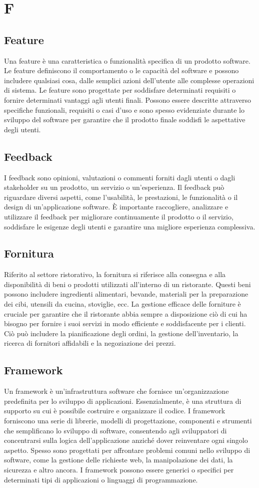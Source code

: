 \section{F}
\subsection{Feature}
Una feature è una caratteristica o funzionalità specifica di un prodotto
software. Le feature definiscono il comportamento o le capacità del software e
possono includere qualsiasi cosa, dalle semplici azioni dell'utente alle
complesse operazioni di sistema. Le feature sono progettate per soddisfare
determinati requisiti o fornire determinati vantaggi agli utenti finali.
Possono essere descritte attraverso specifiche funzionali, requisiti o casi
d'uso e sono spesso evidenziate durante lo sviluppo del software per garantire
che il prodotto finale soddisfi le aspettative degli utenti.
\subsection{Feedback}
I feedback sono opinioni, valutazioni o commenti forniti dagli utenti o dagli stakeholder su un
prodotto, un servizio o un'esperienza. Il feedback può riguardare diversi
aspetti, come l'usabilità, le prestazioni, le funzionalità o il design di
un'applicazione software. È importante raccogliere, analizzare e utilizzare il
feedback per migliorare continuamente il prodotto o il servizio, soddisfare le
esigenze degli utenti e garantire una migliore esperienza complessiva.
\subsection{Fornitura}
Riferito al settore ristorativo, la fornitura si riferisce alla consegna e alla
disponibilità di beni o prodotti utilizzati all'interno di un ristorante.
Questi beni possono includere ingredienti alimentari, bevande, materiali per la
preparazione dei cibi, utensili da cucina, stoviglie, ecc. La gestione efficace
delle forniture è cruciale per garantire che il ristorante abbia sempre a
disposizione ciò di cui ha bisogno per fornire i suoi servizi in modo
efficiente e soddisfacente per i clienti. Ciò può includere la pianificazione
degli ordini, la gestione dell'inventario, la ricerca di fornitori affidabili e
la negoziazione dei prezzi.
\subsection{Framework}
Un framework è un'infrastruttura software che fornisce un'organizzazione
predefinita per lo sviluppo di applicazioni. Essenzialmente, è una struttura di
supporto su cui è possibile costruire e organizzare il codice. I framework
forniscono una serie di librerie, modelli di progettazione, componenti e
strumenti che semplificano lo sviluppo di software, consentendo agli
sviluppatori di concentrarsi sulla logica dell'applicazione anziché dover
reinventare ogni singolo aspetto. Spesso sono progettati per affrontare
problemi comuni nello sviluppo di software, come la gestione delle richieste
web, la manipolazione dei dati, la sicurezza e altro ancora. I framework
possono essere generici o specifici per determinati tipi di applicazioni o
linguaggi di programmazione.
